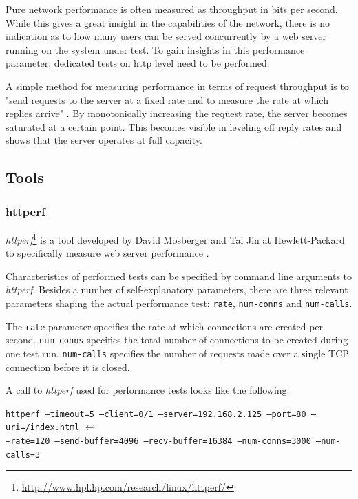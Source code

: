 Pure network performance is often measured as throughput in bits per second. While this gives a great insight in the capabilities of the network, there is no indication as to how many users can be served concurrently by a web server running on the system under test. To gain insights in this performance parameter, dedicated tests on \gls{http} level need to be performed.

A simple method for measuring performance in terms of request throughput is to "send requests to the server at a fixed rate and to measure the rate at which replies arrive" \cite{httperf}. By monotonically increasing the request rate, the server becomes saturated at a certain point. This becomes visible in leveling off reply rates and shows that the server operates at full capacity. \cite{httperf}
\\

\subsection{Tools}

\subsubsection{httperf}

\textit{httperf}\footnote{\url{http://www.hpl.hp.com/research/linux/httperf/}} is a tool developed by David Mosberger and Tai Jin at Hewlett-Packard to specifically measure web server performance \cite{httperf}.

Characteristics of performed tests can be specified by command line arguments to \textit{httperf}. Besides a number of self-explanatory parameters, there are three relevant parameters shaping the actual performance test: \texttt{rate}, \texttt{num-conns} and \texttt{num-calls}.

The \texttt{rate} parameter specifies the rate at which connections are created per second. \texttt{num-conns} specifies the total number of connections to be created during one test run. \texttt{num-calls} specifies the number of requests made over a single TCP connection before it is closed.

A call to \textit{httperf} used for performance tests looks like the following:

\texttt{httperf --timeout=5 --client=0/1 --server=192.168.2.125 --port=80 --uri=/index.html} $\hookleftarrow$ \\
\texttt{--rate=120 --send-buffer=4096 --recv-buffer=16384 --num-conns=3000 --num-calls=3} \\

